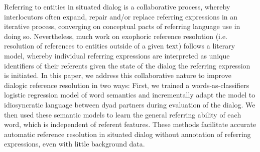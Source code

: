 Referring to entities in situated dialog is a collaborative process, whereby interlocutors often expand, repair and/or replace referring expressions in an iterative process, converging on conceptual pacts of referring language use in doing so. Nevertheless, much work on exophoric reference resolution (i.e. resolution of references to entities outside of a given text) follows a literary model, whereby individual referring expressions are interpreted as unique identifiers of their referents given the state of the dialog the referring expression is initiated. In this paper, we address this collaborative nature to improve dialogic reference resolution in two ways: First, we trained a words-as-classifiers logistic regression model of word semantics and incrementally adapt the model to idiosyncratic language between dyad partners during evaluation of the dialog. We then used these semantic models to learn the general referring ability of each word, which is independent of referent features. These methods facilitate accurate automatic reference resolution in situated dialog without annotation of referring expressions, even with little background data.
